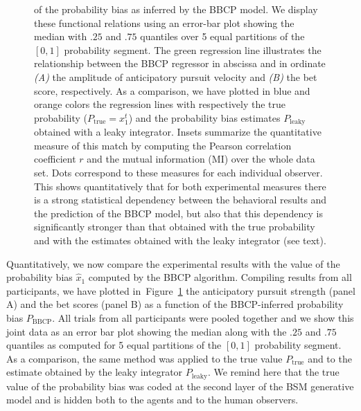 \documentclass[10pt,letterpaper]{article}
\newcommand{\seeFig}[1]{Figure~\ref{fig:#1}}
\begin{document}
\begin{figure}
{of the probability bias as inferred by the BBCP model.
We display these functional relations
using an error-bar plot showing the median with $.25$ and $.75$ quantiles
over 5 equal partitions of the $[0, 1]$ probability segment.
The green regression line illustrates the relationship between the BBCP regressor in abscissa
and in ordinate \textit{(A)} the amplitude of anticipatory pursuit velocity and \textit{(B)} the bet score, respectively.
As a comparison, we have plotted in blue and orange colors the regression lines
with respectively
the true probability ($P_{\text{true}}=x_1^t$) and
the probability bias estimates $P_{\text{leaky}}$ obtained with a leaky integrator.
Insets summarize the quantitative measure of this match
by computing the Pearson correlation coefficient $r$
and the mutual information (MI) over the whole data set.
Dots correspond to these measures for each individual observer.
This shows quantitatively that for both experimental measures
there is a strong statistical dependency between
the behavioral results and the prediction of the BBCP model,
but also that this dependency is significantly stronger than that obtained
with the true probability and with the estimates obtained with the leaky integrator
(see text). %
}
\label{fig:results_psycho_all}
\end{figure}
Quantitatively, we now compare the experimental results
with the value of the probability bias $\hat{x}_1$
computed by the BBCP algorithm.
Compiling results from all participants,
we have plotted in~\seeFig{results_psycho_all}
the anticipatory pursuit strength (panel A) and the bet scores (panel B)
as a function of the BBCP-inferred probability bias  $P_{\text{BBCP}}$.
All trials from all participants were pooled together
and we show this joint data as an error bar plot
showing the median along with the $.25$ and $.75$ quantiles
as computed for 5 equal partitions of the $[0, 1]$ probability segment.
As a comparison, the same method was applied to the true value $P_{\text{true}}$ and
to the estimate obtained by the leaky integrator  $P_{\text{leaky}}$.
We remind here that the true value of the probability bias
was coded at the second layer of the BSM generative model and
is hidden both to the agents and to the human observers.
\end{document}
